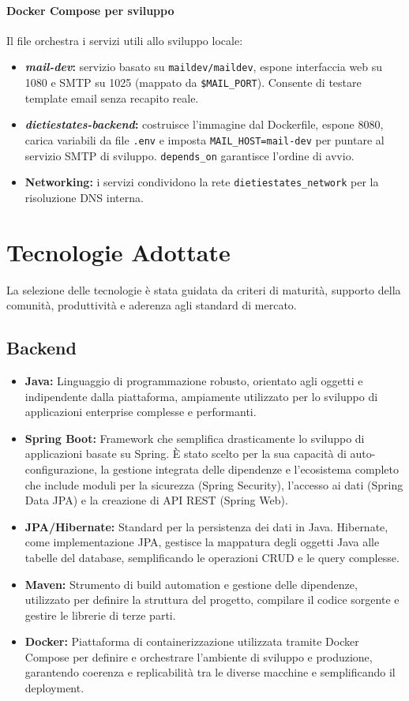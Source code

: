 \paragraph{Docker Compose per sviluppo}
Il file  orchestra i servizi utili allo sviluppo locale:
\begin{itemize}
    \item \textbf{\textit{mail-dev}:} servizio basato su \texttt{maildev/maildev}, espone interfaccia web su 1080 e SMTP su 1025 (mappato da \texttt{\${MAIL\_PORT}}). Consente di testare template email senza recapito reale.
    \item \textbf{\textit{dietiestates-backend}:} costruisce l'immagine dal Dockerfile, espone 8080, carica variabili da file \texttt{.env} e imposta \texttt{MAIL\_HOST=mail-dev} per puntare al servizio SMTP di sviluppo. \texttt{depends\_on} garantisce l'ordine di avvio.
    \item \textbf{Networking:} i servizi condividono la rete \texttt{dietiestates\_network} per la risoluzione DNS interna.
\end{itemize}

\section{Tecnologie Adottate}
\label{sec:tecnologie_adottate}
La selezione delle tecnologie è stata guidata da criteri di maturità, supporto della comunità, produttività e aderenza agli standard di mercato.

\subsection{Backend}
\begin{itemize}
    \item \textbf{Java:} Linguaggio di programmazione robusto, orientato agli oggetti e indipendente dalla piattaforma, ampiamente utilizzato per lo sviluppo di applicazioni enterprise complesse e performanti.
    \item \textbf{Spring Boot:} Framework che semplifica drasticamente lo sviluppo di applicazioni basate su Spring. È stato scelto per la sua capacità di auto-configurazione, la gestione integrata delle dipendenze e l'ecosistema completo che include moduli per la sicurezza (Spring Security), l'accesso ai dati (Spring Data JPA) e la creazione di API REST (Spring Web).
    \item \textbf{JPA/Hibernate:} Standard per la persistenza dei dati in Java. Hibernate, come implementazione JPA, gestisce la mappatura degli oggetti Java alle tabelle del database, semplificando le operazioni CRUD e le query complesse.
    \item \textbf{Maven:} Strumento di build automation e gestione delle dipendenze, utilizzato per definire la struttura del progetto, compilare il codice sorgente e gestire le librerie di terze parti.
    \item \textbf{Docker:} Piattaforma di containerizzazione utilizzata tramite Docker Compose per definire e orchestrare l'ambiente di sviluppo e produzione, garantendo coerenza e replicabilità tra le diverse macchine e semplificando il deployment.
\end{itemize}

